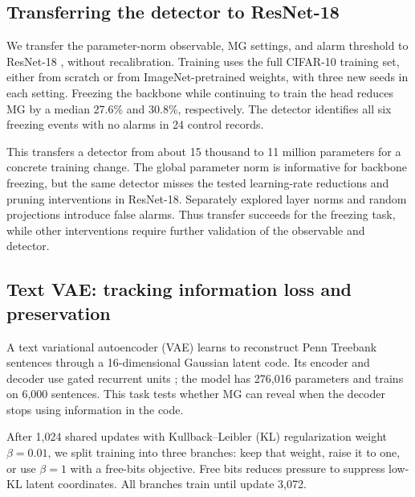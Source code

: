 {\begin{table}[t]
\centering\small
\caption{}
\label{tab:detectors}

\end{table}

\subsection{Transferring the detector to ResNet-18}
We transfer the parameter-norm observable, MG settings, and alarm threshold to ResNet-18 \citep{he2016deep}, without recalibration. Training uses the full CIFAR-10 training set, either from scratch or from ImageNet-pretrained weights, with three new seeds in each setting. Freezing the backbone while continuing to train the head reduces MG by a median 27.6\% and 30.8\%, respectively. The detector identifies all six freezing events with no alarms in 24 control records.

This transfers a detector from about 15 thousand to 11 million parameters for a concrete training change. The global parameter norm is informative for backbone freezing, but the same detector misses the tested learning-rate reductions and pruning interventions in ResNet-18. Separately explored layer norms and random projections introduce false alarms. Thus transfer succeeds for the freezing task, while other interventions require further validation of the observable and detector.

\subsection{Text VAE: tracking information loss and preservation}\label{sec:vae}
A text variational autoencoder (VAE) learns to reconstruct Penn Treebank sentences \citep{marcus1993building} through a 16-dimensional Gaussian latent code. Its encoder and decoder use gated recurrent units \citep{bowman2016generating}; the model has 276,016 parameters and trains on 6,000 sentences. This task tests whether MG can reveal when the decoder stops using information in the code.

After 1,024 shared updates with Kullback--Leibler (KL) regularization weight $\beta=0.01$, we split training into three branches: keep that weight, raise it to one, or use $\beta=1$ with a free-bits objective. Free bits reduces pressure to suppress low-KL latent coordinates. All branches train until update 3,072.

}
